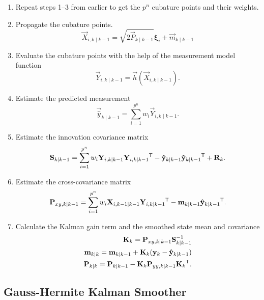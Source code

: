 \begin{enumerate}

  \item Repeat steps 1--3 from earlier to get the $p^n$ cubature points and their weights. 

  \item Propagate the cubature points.%
%
    $$ \vec{X}_{i,k \mid k-1} = \sqrt{2 \vec{P}_{k \mid k-1}} \boldsymbol{\xi}_i + \vec{m}_{k \mid k-1}$$

  \item Evaluate the cubature points with the help of the measurement model function%
%
    $$ \vec{Y}_{i,k \mid k-1} = \vec{h}(\vec{X}_{i,k \mid k-1}). $$

  \item Estimate the predicted measurement%
%
    $$ \vec{\hat{y}}_{k \mid k-1} = \sum_{i=1}^{p^n} w_i \vec{Y}_{i,k \mid k-1}. $$

  \item Estimate the innovation covariance matrix%
%
    $$ \mathbf{S}_{k \mid k-1} = \sum_{i=1}^{p^n} w_i \mathbf{Y}_{i,k \mid k-1} \mathbf{Y}_{i,k \mid k-1}\mathsf{^T} - \mathbf{\hat{y}}_{k \mid k-1} \mathbf{\hat{y}}_{k \mid k-1}\mathsf{^T} + \mathbf{R}_k. $$
    
  \item Estimate the cross-covariance matrix%
%
    $$ \mathbf{P}_{xy,k \mid k-1} = \sum_{i=1}^{p^n} w_i \mathbf{X}_{i,k-1 \mid k-1} \mathbf{Y}_{i,k \mid k-1}\mathsf{^T} - \mathbf{m}_{k \mid k-1} \mathbf{\hat{y}}_{k \mid k-1}\mathsf{^T}.$$ 

  \item Calculate the Kalman gain term and the smoothed state mean and covariance%
%
  \begin{align*}
     \mathbf{K}_k = \mathbf{P}_{xy,k \mid k-1} \mathbf{S}_{k \mid k-1}^{-1} \\
     \mathbf{m}_{k \mid k} = \mathbf{m}_{k \mid k-1} + \mathbf{K}_k(\mathbf{y}_k - \mathbf{\hat{y}}_{k \mid k-1}) \\
     \mathbf{P}_{k \mid k} = \mathbf{P}_{k \mid k-1} - \mathbf{K}_k \mathbf{P}_{yy,k \mid k-1} \mathbf{K}_k\mathsf{^T}. 
  \end{align*}
\end{enumerate}












%
\subsection{Gauss-Hermite Kalman Smoother}
%

